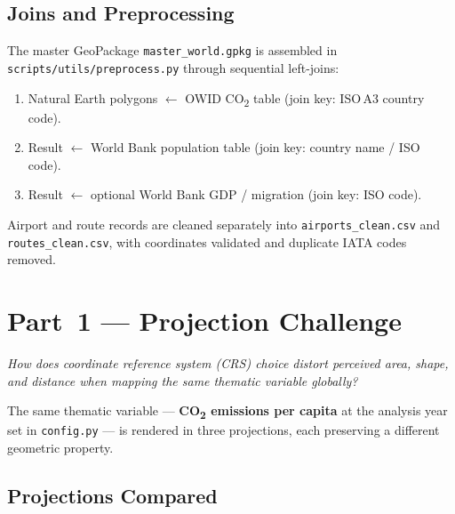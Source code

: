 \documentclass[12pt, a4paper, oneside]{report}
\begin{document}
\section{Joins and Preprocessing}

The master GeoPackage \texttt{master\_world.gpkg} is assembled in
\texttt{scripts/utils/preprocess.py} through sequential left-joins:

\begin{enumerate}[leftmargin=2em, label=\textcolor{accent}{\bfseries Step~\arabic*:}]
  \item Natural Earth polygons $\leftarrow$ OWID CO\textsubscript{2} table
        (join key: ISO\,A3 country code).
  \item Result $\leftarrow$ World Bank population table
        (join key: country name / ISO code).
  \item Result $\leftarrow$ optional World Bank GDP / migration
        (join key: ISO code).
\end{enumerate}

Airport and route records are cleaned separately into \texttt{airports\_clean.csv} and
\texttt{routes\_clean.csv}, with coordinates validated and duplicate IATA codes removed.

\chapter{Part~1 --- Projection Challenge}

\begin{infobox}
\textit{How does coordinate reference system (CRS) choice distort perceived area, shape,
and distance when mapping the same thematic variable globally?}
\end{infobox}

The same thematic variable --- \textbf{CO\textsubscript{2} emissions per capita} at the
analysis year set in \texttt{config.py} --- is rendered in three projections, each
preserving a different geometric property.

\section{Projections Compared}
\end{document}
